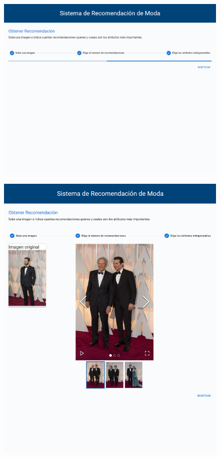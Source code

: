 \documentclass[12pt]{report} %
\begin{document}
\begin{itemize}
		\begin{figure}[H]
			{\includegraphics[scale=0.3]{pantalla-carga.png}}
		\end{figure}
		\begin{figure}[H]
			{\includegraphics[scale=0.4]{output.png}}
		\end{figure}

	\end{itemize}
\end{document}
